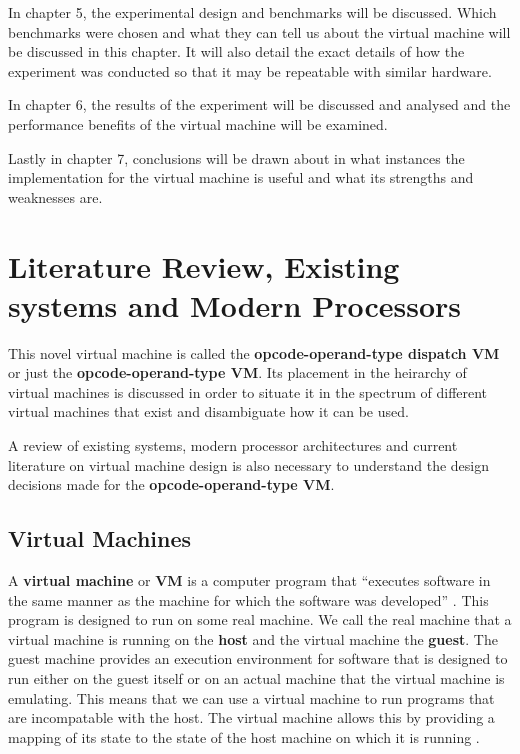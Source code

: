 \documentclass[english,a4paper]{article}
\begin{document}
In chapter 5, the experimental design and benchmarks will be
discussed. Which benchmarks were chosen and what they can tell us
about the virtual machine will be discussed in this chapter. It will
also detail the exact details of how the experiment was conducted so
that it may be repeatable with similar hardware.

In chapter 6, the results of the experiment will be discussed and
analysed and the performance benefits of the virtual machine will be
examined.

Lastly in chapter 7, conclusions will be drawn about in what instances
the implementation for the virtual machine is useful and what its
strengths and weaknesses are.
\newpage{}

\section{Literature Review, Existing systems and Modern Processors}
This novel virtual machine is called the \textbf{opcode-operand-type
  dispatch VM} or just the \textbf{opcode-operand-type VM}. Its
placement in the heirarchy of virtual machines is discussed in order
to situate it in the spectrum of different virtual machines that exist
and disambiguate how it can be used.

A review of existing systems, modern processor architectures and
current literature on virtual machine design is also necessary to
understand the design decisions made for the \textbf{opcode-operand-type
  VM}.

\subsection{Virtual Machines}
A \textbf{virtual machine} or \textbf{VM} is a computer program that
``executes software in the same manner as the machine for which the
software was developed'' \cite[pg9]{JamesE.Smith2005}. This program is
designed to run on some real machine. We call the real machine that a
virtual machine is running on the \textbf{host} and the virtual machine
the \textbf{guest}. The guest machine provides an execution environment
for software that is designed to run either on the guest itself or on
an actual machine that the virtual machine is emulating. This means
that we can use a virtual machine to run programs that are
incompatable with the host. The virtual machine allows this by
providing a mapping of its state to the state of the host machine on
which it is running \cite[pg4]{JamesE.Smith2005}.
\end{document}
